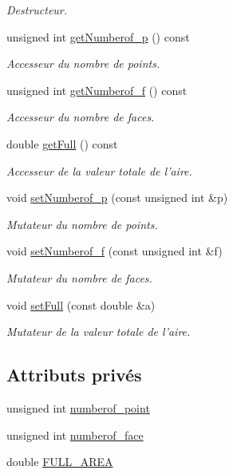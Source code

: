 \begin{DoxyCompactItemize}
\begin{DoxyCompactList}\small\item\em Destructeur. \end{DoxyCompactList}\item 
unsigned int \hyperlink{class_mesh_a9e33572dbe48c4d96f98c2731fd97dcd}{get\-Numberof\-\_\-p} () const 
\begin{DoxyCompactList}\small\item\em Accesseur du nombre de points. \end{DoxyCompactList}\item 
unsigned int \hyperlink{class_mesh_ac5fdb24c0693a8d02c739cd254b826e1}{get\-Numberof\-\_\-f} () const 
\begin{DoxyCompactList}\small\item\em Accesseur du nombre de faces. \end{DoxyCompactList}\item 
double \hyperlink{class_mesh_abf4ba84ba3a807377f391cd2bf37f2fe}{get\-Full} () const 
\begin{DoxyCompactList}\small\item\em Accesseur de la valeur totale de l'aire. \end{DoxyCompactList}\item 
void \hyperlink{class_mesh_a76b45fbfdfa33d0f0285f86a918192ba}{set\-Numberof\-\_\-p} (const unsigned int \&p)
\begin{DoxyCompactList}\small\item\em Mutateur du nombre de points. \end{DoxyCompactList}\item 
void \hyperlink{class_mesh_ad1b46c508d09b76ac575564fcaa24931}{set\-Numberof\-\_\-f} (const unsigned int \&f)
\begin{DoxyCompactList}\small\item\em Mutateur du nombre de faces. \end{DoxyCompactList}\item 
void \hyperlink{class_mesh_ab5b9b1d7b1a616def0cefb1f8fd7b7a4}{set\-Full} (const double \&a)
\begin{DoxyCompactList}\small\item\em Mutateur de la valeur totale de l'aire. \end{DoxyCompactList}\end{DoxyCompactItemize}
\subsection*{Attributs privés}
\begin{DoxyCompactItemize}
\item 
unsigned int \hyperlink{class_mesh_a9c058bf3f414b6119d7e6ea09703057d}{numberof\-\_\-point}
\item 
unsigned int \hyperlink{class_mesh_a8ad7f6788ff772d5e0e17e992571f364}{numberof\-\_\-face}
\item 
double \hyperlink{class_mesh_a0e1f18abe6ea5a9943e6f8e672f8b037}{F\-U\-L\-L\-\_\-\-A\-R\-E\-A}
\end{DoxyCompactItemize}


